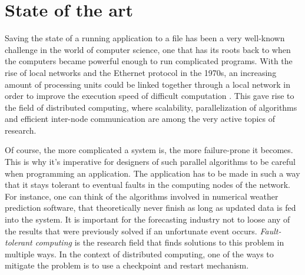 {
\setlength{\parindent}{2em}
\chapter{State of the art}\label{cha:state-of-the-art}
Saving the state of a running application to a file has been a very well-known challenge in the world of computer science, one that has its roots back to when the computers became powerful enough to run complicated programs. With the rise of local networks and the Ethernet protocol in the 1970s, an increasing amount of processing units could be linked together through a local network in order to improve the execution speed of difficult computation \cite{book:andrews}. This gave rise to the field of distributed computing, where scalability, parallelization of algorithms and efficient inter-node communication are among the very active topics of research.

Of course, the more complicated a system is, the more failure-prone it becomes. This is why it's imperative for designers of such parallel algorithms to be careful when programming an application. The application has to be made in such a way that it stays tolerant to eventual faults in the computing nodes of the network. For instance, one can think of the algorithms involved in numerical weather prediction software, that theoretically never finish as long as updated data is fed into the system. It is important for the forecasting industry not to loose any of the results that were previously solved if an unfortunate event occurs. \textit{Fault-tolerant computing} is the research field that finds solutions to this problem in multiple ways. In the context of distributed computing, one of the ways to mitigate the problem is to use a checkpoint and restart mechanism.

}
